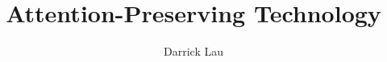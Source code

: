 \documentclass[a4paper,12pt,twoside]{report}
\begin{document}
\title{\LARGE {\bf Attention-Preserving Technology}\\
 \vspace*{6mm}
}

\author{Darrick Lau}

\normallinespacing
\maketitle
\preface




\body









\appendix



\end{document}

